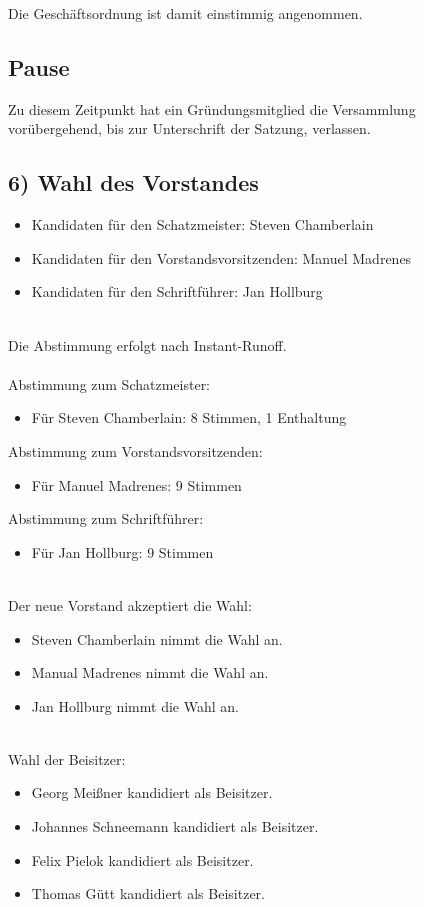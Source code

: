 \documentclass[10pt,a4paper]{scrartcl}
\newcommand{\qs}[1]{\glqq#1\grqq}
\begin{document}
Die Gesch{\"a}ftsordnung ist damit einstimmig angenommen.

\subsection*{Pause}
Zu diesem Zeitpunkt hat ein Gr{\"u}ndungsmitglied die Versammlung vor{\"u}bergehend, bis zur Unterschrift der Satzung, verlassen.
\subsection*{6) Wahl des Vorstandes}
\begin{itemize}
\item Kandidaten f{\"u}r den Schatzmeister: Steven Chamberlain
\item Kandidaten f{\"u}r den Vorstandsvorsitzenden: Manuel Madrenes
\item Kandidaten f{\"u}r den Schriftf{\"u}hrer: Jan Hollburg\\\\
\end{itemize}
Die Abstimmung erfolgt nach \qs{Instant-Runoff}.\\\\
    Abstimmung zum Schatzmeister:
\begin{itemize}
\item F{\"u}r Steven Chamberlain: 8 Stimmen, 1 Enthaltung
\end{itemize}
    Abstimmung zum Vorstandsvorsitzenden:
\begin{itemize}
\item F{\"u}r Manuel Madrenes: 9 Stimmen
\end{itemize}
    Abstimmung zum Schriftf{\"u}hrer:
\begin{itemize}
\item F{\"u}r Jan Hollburg: 9 Stimmen\\\\
\end{itemize}
Der neue Vorstand akzeptiert die Wahl:
\begin{itemize}
\item Steven Chamberlain nimmt die Wahl an.
\item Manual Madrenes nimmt die Wahl an.
\item Jan Hollburg nimmt die Wahl an.\\\\
\end{itemize}
    Wahl der Beisitzer:
\begin{itemize}
\item Georg Mei{\ss}ner kandidiert als Beisitzer.
\item Johannes Schneemann kandidiert als Beisitzer.
\item Felix Pielok kandidiert als Beisitzer.
\item Thomas G{\"u}tt kandidiert als Beisitzer.\\\\
\end{itemize}
\end{document}
